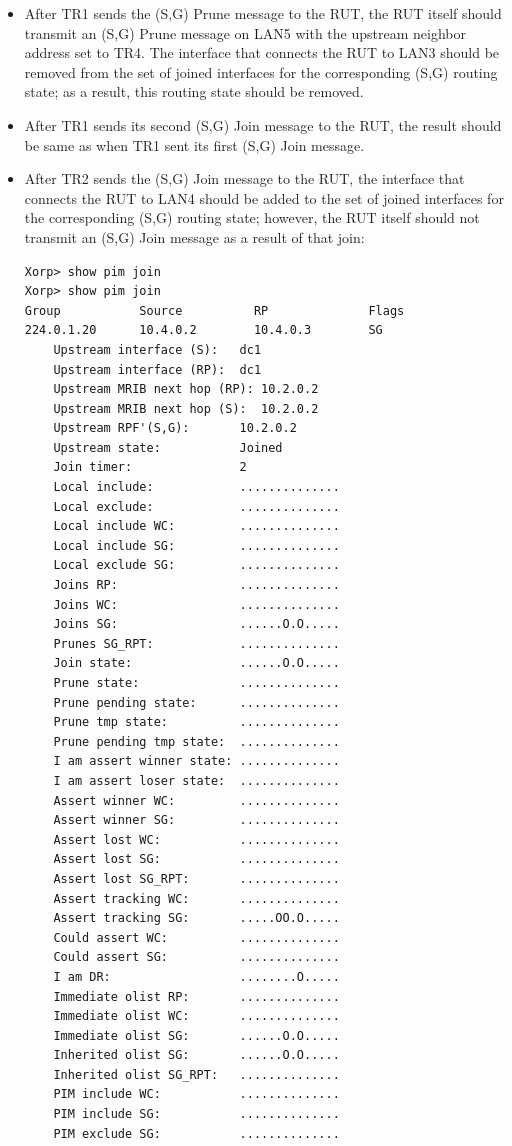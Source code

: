 \documentclass[11pt]{report}
\begin{document}
\begin{itemize}
  \item After TR1 sends the (S,G) Prune message to the RUT, the RUT itself
  should transmit an (S,G) Prune message on LAN5 with the upstream neighbor
  address set to TR4. The interface that connects the RUT to LAN3 should be
  removed from the set of joined interfaces for the corresponding (S,G)
  routing state; as a result, this routing state should be removed.

  \item After TR1 sends its second (S,G) Join message to the RUT, the
  result should be same as when TR1 sent its first (S,G) Join message.

  \item After TR2 sends the (S,G) Join message to the RUT, the interface
  that connects the RUT to LAN4 should be added to the set of joined
  interfaces for the corresponding (S,G) routing state; however, the RUT
  itself should not transmit an (S,G) Join message as a result of that
  join:

\begin{verbatim}
Xorp> show pim join
Xorp> show pim join 
Group           Source          RP              Flags
224.0.1.20      10.4.0.2        10.4.0.3        SG   
    Upstream interface (S):   dc1
    Upstream interface (RP):  dc1
    Upstream MRIB next hop (RP): 10.2.0.2
    Upstream MRIB next hop (S):  10.2.0.2
    Upstream RPF'(S,G):       10.2.0.2
    Upstream state:           Joined 
    Join timer:               2
    Local include:            ..............
    Local exclude:            ..............
    Local include WC:         ..............
    Local include SG:         ..............
    Local exclude SG:         ..............
    Joins RP:                 ..............
    Joins WC:                 ..............
    Joins SG:                 ......O.O.....
    Prunes SG_RPT:            ..............
    Join state:               ......O.O.....
    Prune state:              ..............
    Prune pending state:      ..............
    Prune tmp state:          ..............
    Prune pending tmp state:  ..............
    I am assert winner state: ..............
    I am assert loser state:  ..............
    Assert winner WC:         ..............
    Assert winner SG:         ..............
    Assert lost WC:           ..............
    Assert lost SG:           ..............
    Assert lost SG_RPT:       ..............
    Assert tracking WC:       ..............
    Assert tracking SG:       .....OO.O.....
    Could assert WC:          ..............
    Could assert SG:          ..............
    I am DR:                  ........O.....
    Immediate olist RP:       ..............
    Immediate olist WC:       ..............
    Immediate olist SG:       ......O.O.....
    Inherited olist SG:       ......O.O.....
    Inherited olist SG_RPT:   ..............
    PIM include WC:           ..............
    PIM include SG:           ..............
    PIM exclude SG:           ..............
\end{verbatim}


\end{itemize}
\end{document}
